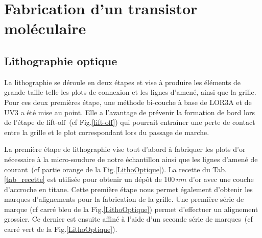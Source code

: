 \chapter{Fabrication d'un transistor moléculaire}

\section{Lithographie optique}
La lithographie se déroule en deux étapes et vise à produire les éléments de grande taille telle les plots de connexion et les lignes d'amené, ainsi que la grille. Pour ces deux premières étape, une méthode bi-couche à base de LOR3A et de UV3 a été mise au point. Elle a l'avantage de prévenir la formation de bord lors de l'étape de lift-off~(cf Fig.\ref{lift-off}) qui pourrait entraîner une perte de contact entre la grille et le plot correspondant lors du passage de marche.

La première étape de lithographie vise tout d'abord à fabriquer les plots d'or nécessaire à la micro-soudure de notre échantillon ainsi que les lignes d'amené de courant~(cf partie orange de la Fig.\ref{LithoOptique}). La recette du Tab.\ref{tab_recette}  est utilisée pour obtenir un dép\^ot de 100$\,nm$ d'or avec une couche d'accroche en titane. Cette première étape nous permet également d'obtenir les marques d'alignements pour la fabrication de la grille. Une première série de marque (cf carré bleu de la Fig.\ref{LithoOptique}) permet d'effectuer un alignement grossier. Ce dernier est ensuite affiné à l'aide d'un seconde série de marques~(cf carré vert de la Fig.\ref{LithoOptique}).


